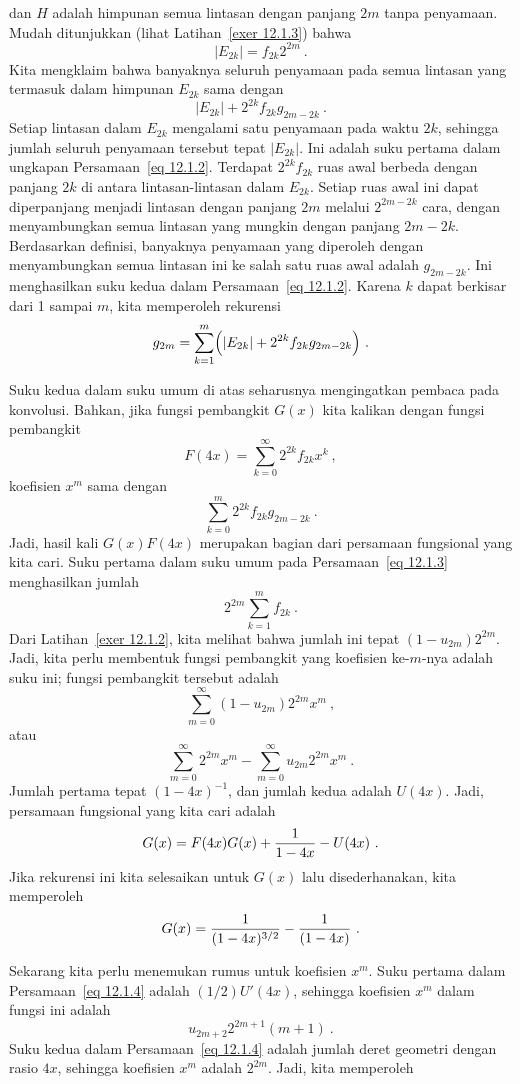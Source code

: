 \begin{example}
dan $H$ adalah himpunan semua lintasan dengan panjang $2m$ tanpa penyamaan.  Mudah ditunjukkan (lihat
Latihan~\ref{exer 12.1.3}) bahwa
$$|E_{2k}| = f_{2k} 2^{2m}\ .$$
Kita mengklaim bahwa banyaknya seluruh penyamaan pada semua lintasan yang termasuk dalam himpunan $E_{2k}$ sama
dengan 
\begin{equation}
|E_{2k}| + 2^{2k} f_{2k} g_{2m - 2k}\ .
\label{eq 12.1.2}  
\end{equation}
Setiap lintasan dalam $E_{2k}$ mengalami satu penyamaan pada waktu $2k$, sehingga jumlah seluruh
penyamaan tersebut tepat $|E_{2k}|$.  Ini adalah suku pertama dalam ungkapan Persamaan~\ref{eq 12.1.2}. 
Terdapat $2^{2k} f_{2k}$ ruas awal berbeda dengan panjang $2k$ di antara lintasan-lintasan dalam
$E_{2k}$.  Setiap ruas awal ini dapat diperpanjang menjadi lintasan dengan panjang $2m$ melalui
$2^{2m-2k}$ cara, dengan menyambungkan semua lintasan yang mungkin dengan panjang $2m - 2k$.  Berdasarkan
definisi, banyaknya penyamaan yang diperoleh dengan menyambungkan semua lintasan ini ke salah satu ruas awal adalah
$g_{2m - 2k}$.  Ini menghasilkan suku kedua dalam Persamaan~\ref{eq 12.1.2}.  Karena $k$
dapat berkisar dari 1 sampai $m$, kita memperoleh rekurensi
\begin{equation}  
g_{2m} = \sum_{k = 1}^m \Bigl(|E_{2k}| + 2^{2k}f_{2k}g_{2m - 2k}\Bigr)\ .
\label{eq 12.1.3}  
\end{equation}                                                                        
\par
Suku kedua dalam suku umum di atas seharusnya mengingatkan pembaca pada konvolusi.  Bahkan,
jika fungsi pembangkit $G(x)$ kita kalikan dengan fungsi pembangkit 
$$F(4x) = \sum_{k = 0}^\infty 2^{2k}f_{2k} x^k\ ,$$
koefisien $x^m$ sama dengan
$$\sum_{k = 0}^m 2^{2k}f_{2k}g_{2m-2k}\ .$$
Jadi, hasil kali $G(x)F(4x)$ merupakan bagian dari persamaan fungsional yang kita cari.  Suku
pertama dalam suku umum pada Persamaan~\ref{eq 12.1.3} menghasilkan jumlah
$$2^{2m}\sum_{k = 1}^m f_{2k}\ .$$
Dari Latihan~\ref{exer 12.1.2}, kita melihat bahwa jumlah ini tepat $(1 - u_{2m})2^{2m}$.    Jadi, kita perlu
membentuk fungsi pembangkit yang koefisien ke-$m$-nya adalah suku ini; fungsi pembangkit tersebut adalah
$$\sum_{m = 0}^\infty (1- u_{2m})2^{2m} x^m\ ,$$
atau
$$\sum_{m = 0}^\infty 2^{2m} x^m - \sum_{m = 0}^\infty u_{2m}2^{2m} x^m\ .$$
Jumlah pertama tepat $(1-4x)^{-1}$, dan jumlah kedua adalah $U(4x)$.  Jadi, persamaan
fungsional yang kita cari adalah
$$G(x) = F(4x)G(x) + {1\over{1-4x}} - U(4x)\ .$$
Jika rekurensi ini kita selesaikan untuk $G(x)$ lalu disederhanakan, kita memperoleh
\begin{equation}  
G(x) = {1\over{(1-4x)^{3/2}}} - {1\over{(1-4x)}}\ .
\label{eq 12.1.4}  
\end{equation}                                                                        
\par
Sekarang kita perlu menemukan rumus untuk koefisien $x^m$.  Suku pertama dalam 
Persamaan~\ref{eq 12.1.4} adalah $(1/2)U'(4x)$, sehingga koefisien $x^m$ dalam fungsi ini adalah
$$u_{2m+2} 2^{2m+1}(m+1)\ .$$
Suku kedua dalam Persamaan~\ref{eq 12.1.4} adalah jumlah deret geometri dengan rasio 
$4x$, sehingga koefisien $x^m$ adalah $2^{2m}$.  Jadi, kita memperoleh


\end{example}

